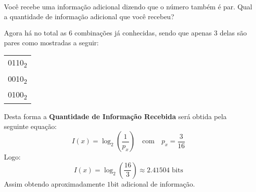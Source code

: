 \documentclass{article}
\begin{document}
            \begin{exercise}
                Você recebe uma informação adicional dizendo que o número também é par. Qual a quantidade de informação adicional que você recebeu?
            \end{exercise}
            \begin{resolution}
                Agora há no total as 6 combinações já conhecidas, sendo que apenas 3 delas são pares como mostradas a seguir:
                    \begin{table}[H]
                        \centering
                        \begin{tabular}[]{c}\hline
                            0110\textsubscript{2}\\
                            0010\textsubscript{2}\\
                            0100\textsubscript{2}\\\hline
                        \end{tabular}
                    \end{table}\noindent
                Desta forma a \textbf{Quantidade de Informação Recebida} será obtida pela seguinte equação:
                    \begin{equation*}
                        I(x) = \log_{2}\left(\frac{1}{p_{x}}\right)
                        \quad\text{com}\quad
                        p_{x} = \frac{3}{16}
                    \end{equation*}
                Logo:
                    \begin{equation*}
                        I(x) = \log_{2}\left(\frac{16}{3}\right) \approx 2.41504 \text{ bits}
                    \end{equation*}
                Assim obtendo aproximadamente $\boxed{1 \text{bit}}$ adicional de informação.
            \end{resolution}
\end{document}
